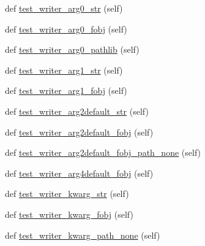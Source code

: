 \begin{DoxyCompactItemize}
def \hyperlink{classnetworkx_1_1utils_1_1tests_1_1test__decorators_1_1TestOpenFileDecorator_a15c5f47c5a06c9aaeb588cc3f622df9f}{test\+\_\+writer\+\_\+arg0\+\_\+str} (self)
\item 
def \hyperlink{classnetworkx_1_1utils_1_1tests_1_1test__decorators_1_1TestOpenFileDecorator_a0476ece899dfd8b76204b1bf6a4c240c}{test\+\_\+writer\+\_\+arg0\+\_\+fobj} (self)
\item 
def \hyperlink{classnetworkx_1_1utils_1_1tests_1_1test__decorators_1_1TestOpenFileDecorator_a8a705b7876789a43f851e0cc821cf13b}{test\+\_\+writer\+\_\+arg0\+\_\+pathlib} (self)
\item 
def \hyperlink{classnetworkx_1_1utils_1_1tests_1_1test__decorators_1_1TestOpenFileDecorator_a71149d63a24d663f30c885712d4efd97}{test\+\_\+writer\+\_\+arg1\+\_\+str} (self)
\item 
def \hyperlink{classnetworkx_1_1utils_1_1tests_1_1test__decorators_1_1TestOpenFileDecorator_a916d3e9fc693e358dd04949f5cc90891}{test\+\_\+writer\+\_\+arg1\+\_\+fobj} (self)
\item 
def \hyperlink{classnetworkx_1_1utils_1_1tests_1_1test__decorators_1_1TestOpenFileDecorator_a08d3e5c0adf230834967122bce5acd38}{test\+\_\+writer\+\_\+arg2default\+\_\+str} (self)
\item 
def \hyperlink{classnetworkx_1_1utils_1_1tests_1_1test__decorators_1_1TestOpenFileDecorator_af21bb602b6fda4a4dcc7fbb3eff9b835}{test\+\_\+writer\+\_\+arg2default\+\_\+fobj} (self)
\item 
def \hyperlink{classnetworkx_1_1utils_1_1tests_1_1test__decorators_1_1TestOpenFileDecorator_a1509affcfa3235d61b22e535ba68cee7}{test\+\_\+writer\+\_\+arg2default\+\_\+fobj\+\_\+path\+\_\+none} (self)
\item 
def \hyperlink{classnetworkx_1_1utils_1_1tests_1_1test__decorators_1_1TestOpenFileDecorator_acf0091b97696f97dd63337d3a4ed1fc6}{test\+\_\+writer\+\_\+arg4default\+\_\+fobj} (self)
\item 
def \hyperlink{classnetworkx_1_1utils_1_1tests_1_1test__decorators_1_1TestOpenFileDecorator_a6bf614cd7712f264317e0bc70dc1a84c}{test\+\_\+writer\+\_\+kwarg\+\_\+str} (self)
\item 
def \hyperlink{classnetworkx_1_1utils_1_1tests_1_1test__decorators_1_1TestOpenFileDecorator_a64b7da1db39d5eb0b88b06afffa99df1}{test\+\_\+writer\+\_\+kwarg\+\_\+fobj} (self)
\item 
def \hyperlink{classnetworkx_1_1utils_1_1tests_1_1test__decorators_1_1TestOpenFileDecorator_a3683a41d893bd9dea7a43067fda104a5}{test\+\_\+writer\+\_\+kwarg\+\_\+path\+\_\+none} (self)
\end{DoxyCompactItemize}
